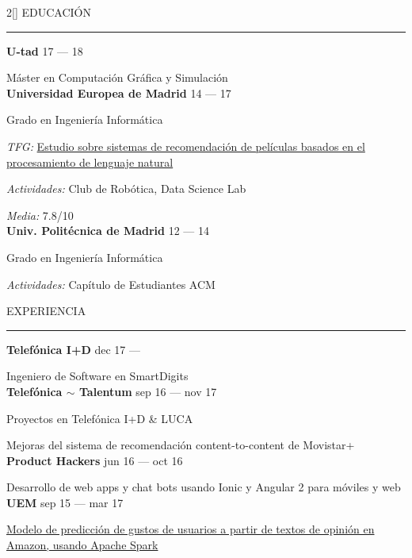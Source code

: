 \documentclass[a4paper, 12pt]{article}
\newenvironment{myparacol}[2][]{%
\begin{paracol}{#2}[#1]\setlength{\parindent}{0pt}}{%
\end{paracol}}
\begin{document}
\setlength{\columnsep}{24pt}
\begin{sloppypar}
\begin{myparacol}{2}
    EDUCACIÓN
    \vspace{1mm}
    \hrule
    \kern9pt
    \textbf{U-tad} \hfill 17 --- 18

    Máster en Computación Gráfica y Simulación\\

    \textbf{Universidad Europea de Madrid} \hfill 14 --- 17

    Grado en Ingeniería Informática

    \textit{TFG:} \href{https://github.com/hugo19941994/movie-pepper-doc/raw/master/thesis.pdf}{Estudio sobre sistemas de recomendación de películas basados en el procesamiento de lenguaje natural}

    \textit{Actividades:} Club de Robótica, Data Science Lab

    \textit{Media:} 7.8/10\\

    \textbf{Univ. Politécnica de Madrid} \hfill 12 --- 14

    Grado en Ingeniería Informática

    \textit{Actividades:} Capítulo de Estudiantes ACM
    \\

    \switchcolumn{}

    EXPERIENCIA
    \vspace{1mm}
    \hrule
    \kern9pt

    \textbf{Telefónica I+D} \hfill dec 17 ---

    Ingeniero de Software en SmartDigits\\

    \textbf{Telefónica $\sim$ Talentum} \hfill sep 16 --- nov 17

    Proyectos en Telefónica I+D \& LUCA

    Mejoras del sistema de recomendación content-to-content de Movistar+\\

    \textbf{Product Hackers} \hfill jun 16 --- oct 16

    Desarrollo de web apps y chat bots usando Ionic y Angular 2 para móviles y web\\

    \textbf{UEM} \hfill sep 15 --- mar 17

    \href{https://www.researchgate.net/publication/314142014_Prediction_of_User_Opinion_for_Products_-_A_Bag-of-Words_and_Collaborative_Filtering_based_Approach}{Modelo de predicción de gustos de usuarios a partir de textos de opinión en Amazon, usando Apache Spark}


\end{myparacol}
\end{sloppypar}
\end{document}
